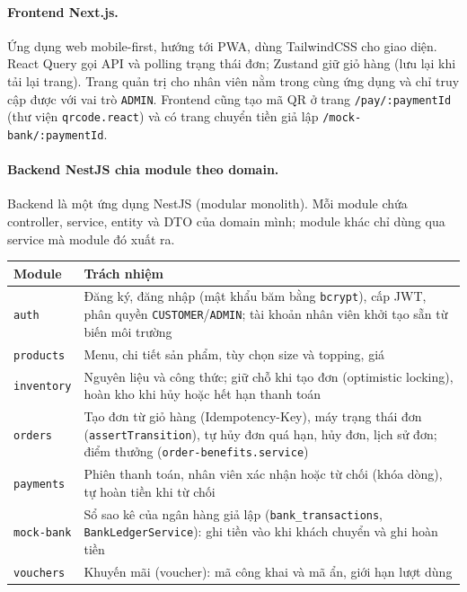 \paragraph{Frontend Next.js.}

Ứng dụng web mobile-first, hướng tới PWA, dùng TailwindCSS cho giao diện. React Query gọi API và polling trạng thái đơn; Zustand giữ giỏ hàng (lưu lại khi tải lại trang). Trang quản trị cho nhân viên nằm trong cùng ứng dụng và chỉ truy cập được với vai trò \texttt{ADMIN}. Frontend cũng tạo mã QR ở trang \texttt{/pay/:paymentId} (thư viện \texttt{qrcode.react}) và có trang chuyển tiền giả lập \texttt{/mock-bank/:paymentId}.

\paragraph{Backend NestJS chia module theo domain.}

Backend là một ứng dụng NestJS (modular monolith). Mỗi module chứa controller, service, entity và DTO của domain mình; module khác chỉ dùng qua service mà module đó xuất ra.

{\small\renewcommand{\arraystretch}{1.25}
\begin{tabularx}{\linewidth}{@{}l X@{}}
\toprule
\textbf{Module} & \textbf{Trách nhiệm} \\
\midrule
\texttt{auth} & Đăng ký, đăng nhập (mật khẩu băm bằng \texttt{bcrypt}), cấp JWT, phân quyền \texttt{CUSTOMER}/\texttt{ADMIN}; tài khoản nhân viên khởi tạo sẵn từ biến môi trường \\
\texttt{products} & Menu, chi tiết sản phẩm, tùy chọn size và topping, giá \\
\texttt{inventory} & Nguyên liệu và công thức; giữ chỗ khi tạo đơn (optimistic locking), hoàn kho khi hủy hoặc hết hạn thanh toán \\
\texttt{orders} & Tạo đơn từ giỏ hàng (Idempotency-Key), máy trạng thái đơn (\texttt{assertTransition}), tự hủy đơn quá hạn, hủy đơn, lịch sử đơn; điểm thưởng (\texttt{order-benefits.service}) \\
\texttt{payments} & Phiên thanh toán, nhân viên xác nhận hoặc từ chối (khóa dòng), tự hoàn tiền khi từ chối \\
\texttt{mock-bank} & Sổ sao kê của ngân hàng giả lập (\texttt{bank\_transactions}, \texttt{BankLedgerService}): ghi tiền vào khi khách chuyển và ghi hoàn tiền \\
\texttt{vouchers} & Khuyến mãi (voucher): mã công khai và mã ẩn, giới hạn lượt dùng \\
\bottomrule
\end{tabularx}}


